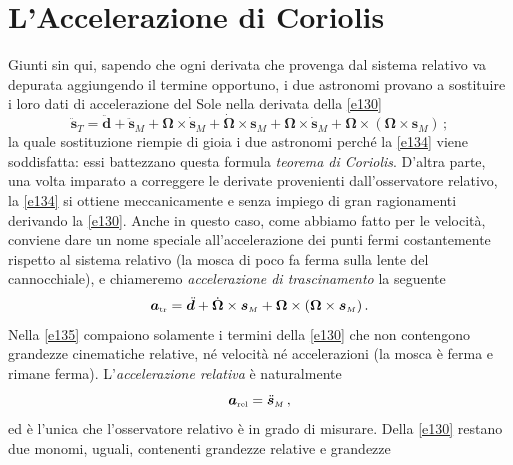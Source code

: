 \section{L'Accelerazione di Coriolis}

\noindent Giunti sin qui, sapendo che ogni derivata che provenga dal sistema relativo va depurata
aggiungendo il termine opportuno, i due astronomi provano a sostituire i loro
dati di accelerazione del Sole nella derivata della \ref{e130}
\begin{equation}
\ddot{\bm{s}}_{\scriptscriptstyle{T}}=
	\ddot{\bm{d}}+
\ddot{\bm{s}}_{\scriptscriptstyle{M}}+
 {\bm \Omega}\times 
\dot{\bm{s}}_{\scriptscriptstyle{M}}+
\dot{\bm \Omega}\times 
	\bm{s}_{\scriptscriptstyle{M}}+
 {\bm \Omega}\times 
\dot{\bm{s}}_{\scriptscriptstyle{M}}+
 {\bm \Omega}\times( 
 {\bm \Omega}\times 
	\bm{s}_{\scriptscriptstyle{M}})\,;
\label{e134}
\end{equation}
\noindent la quale sostituzione riempie di gioia i due astronomi perch\'e la
\ref{e134} viene soddisfatta: essi battezzano questa formula 
{\em teorema di Coriolis}. D'altra parte, una volta imparato a correggere le 
derivate provenienti dall'osservatore relativo, la \ref{e134} si ottiene
meccanicamente e senza impiego di gran ragionamenti derivando la \ref{e130}.
Anche in questo caso, come abbiamo fatto per le velocit\`a,
 conviene dare un nome speciale all'accelerazione 
dei punti fermi costantemente rispetto al sistema relativo (la mosca di 
poco fa ferma sulla lente del cannocchiale), e chiameremo 
{\em accelerazione di trascinamento} la seguente
\begin{equation}
{\bm a}_{\scriptscriptstyle{{\rm tr}}}=
	\ddot{\bm{d}}+
\dot{\bm \Omega}\times 
	\bm{s}_{\scriptscriptstyle{M}}+
 {\bm \Omega}\times( 
 {\bm \Omega}\times 
        \bm{s}_{\scriptscriptstyle{M}})\,.
\label{e135}
\end{equation}
\noindent Nella \ref{e135} compaiono solamente i termini della \ref{e130} che non contengono
grandezze cinematiche relative, n\'e velocit\`a n\'e accelerazioni (la mosca \`e ferma e rimane ferma).
L'{\em accelerazione relativa} \`e naturalmente
\begin{equation}
{\bm a}_{\scriptscriptstyle{{\rm rel}}}=
\ddot{\bm{s}}_{\scriptscriptstyle{M}}\,,
\label{e136}
\end{equation}
\noindent ed \`e l'unica che l'osservatore relativo \`e in grado di misurare.
Della \ref{e130} restano due monomi, uguali, contenenti grandezze relative e grandezze

